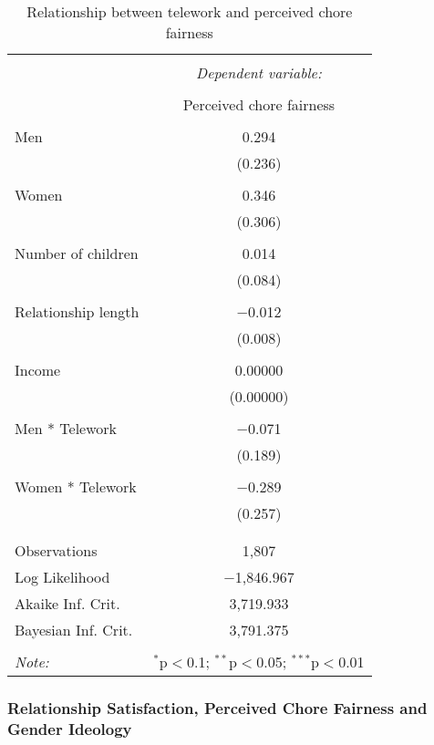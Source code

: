 \documentclass[
  english,
  man]{apa6}
\begin{document}
\begin{table}[!htbp] \centering 
  \caption{Relationship between telework and perceived chore fairness} 
  \label{} 
\begin{tabular}{@{\extracolsep{5pt}}lc} 
\\[-1.8ex]\hline 
\hline \\[-1.8ex] 
 & \multicolumn{1}{c}{\textit{Dependent variable:}} \\ 
\cline{2-2} 
\\[-1.8ex] & Perceived chore fairness \\ 
\hline \\[-1.8ex] 
 Men & 0.294 \\ 
  & (0.236) \\ 
  & \\ 
 Women & 0.346 \\ 
  & (0.306) \\ 
  & \\ 
 Number of children & 0.014 \\ 
  & (0.084) \\ 
  & \\ 
 Relationship length & $-$0.012 \\ 
  & (0.008) \\ 
  & \\ 
 Income & 0.00000 \\ 
  & (0.00000) \\ 
  & \\ 
 Men * Telework & $-$0.071 \\ 
  & (0.189) \\ 
  & \\ 
 Women * Telework & $-$0.289 \\ 
  & (0.257) \\ 
  & \\ 
\hline \\[-1.8ex] 
Observations & 1,807 \\ 
Log Likelihood & $-$1,846.967 \\ 
Akaike Inf. Crit. & 3,719.933 \\ 
Bayesian Inf. Crit. & 3,791.375 \\ 
\hline 
\hline \\[-1.8ex] 
\textit{Note:}  & \multicolumn{1}{r}{$^{*}$p$<$0.1; $^{**}$p$<$0.05; $^{***}$p$<$0.01} \\
\end{tabular} 
\end{table}

\hypertarget{relationship-satisfaction-perceived-chore-fairness-and-gender-ideology}{%
\subsubsection{Relationship Satisfaction, Perceived Chore Fairness and Gender Ideology}\label{relationship-satisfaction-perceived-chore-fairness-and-gender-ideology}}
\end{document}
